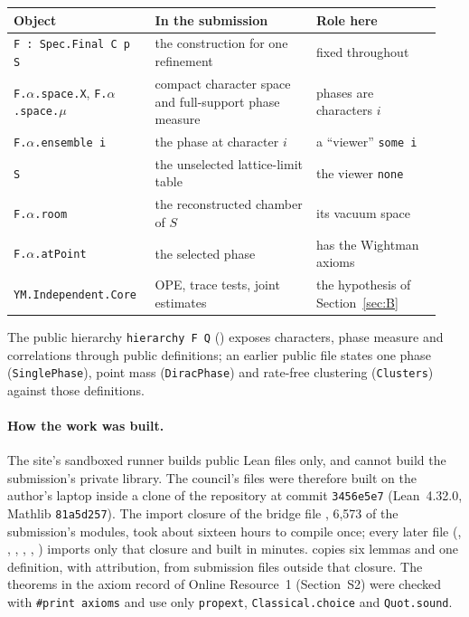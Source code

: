 \documentclass[11pt,a4paper]{article}
\newcommand{\lean}[1]{\texttt{#1}}
\theoremstyle{plain}
\begin{document}
\begin{center}
\small
\begin{tabular}{@{}>{\raggedright}p{0.3\linewidth}>{\raggedright}p{0.36\linewidth}>{\raggedright\arraybackslash}p{0.28\linewidth}@{}}
\toprule
Object & In the submission & Role here\\
\midrule
\lean{F : Spec.Final C p S} & the construction for one refinement & fixed throughout\\
\lean{F.$\alpha$.space.X}, \lean{F.$\alpha$.space.$\mu$} & compact character space and full-support phase measure & phases are characters $i$\\
\lean{F.$\alpha$.ensemble i} & the phase at character $i$ & a ``viewer'' \lean{some i}\\
\lean{S} & the unselected lattice-limit table & the viewer \lean{none}\\
\lean{F.$\alpha$.room} & the reconstructed chamber of $S$ & its vacuum space\\
\lean{F.$\alpha$.atPoint} & the selected phase & has the Wightman axioms\\
\lean{YM.Independent.Core} & OPE, trace tests, joint estimates & the hypothesis of Section~\ref{sec:B}\\
\bottomrule
\end{tabular}
\end{center}

The public hierarchy \lean{hierarchy F Q} () exposes characters, phase measure and correlations through public definitions; an earlier public file states one phase (\lean{SinglePhase}), point mass (\lean{DiracPhase}) and rate-free clustering (\lean{Clusters}) against those definitions.

\paragraph{How the work was built.} The site's sandboxed runner builds public Lean files only, and cannot build the submission's private library. The council's files were therefore built on the author's laptop inside a clone of the repository at commit \texttt{3456e5e7} (Lean~4.32.0, Mathlib \texttt{81a5d257}). The import closure of the bridge file , 6,573 of the submission's modules, took about sixteen hours to compile once; every later file (, , , , , ) imports only that closure and built in minutes.  copies six lemmas and one definition, with attribution, from submission files outside that closure. The theorems in the axiom record of Online Resource~1 (Section~S2) were checked with \lean{\#print axioms} and use only \lean{propext}, \lean{Classical.choice} and \lean{Quot.sound}.
\end{document}

